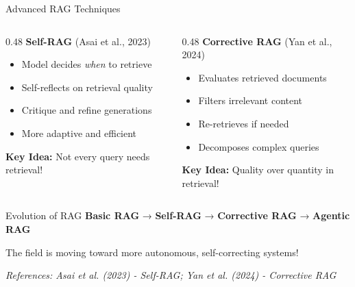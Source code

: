 \documentclass[aspectratio=169]{beamer}
\begin{document}
\begin{frame}[shrink=10]{Advanced RAG Techniques 🚀}
\begin{columns}[T]
\begin{column}{0.48\textwidth}
\textbf{Self-RAG} (Asai et al., 2023)
\begin{itemize}\setlength{\itemsep}{0pt}
    \item Model decides \textit{when} to retrieve
    \item Self-reflects on retrieval quality
    \item Critique and refine generations
    \item More adaptive and efficient
\end{itemize}

\vspace{1em}

\textbf{Key Idea:}
Not every query needs retrieval!
\end{column}

\begin{column}{0.48\textwidth}
\textbf{Corrective RAG} (Yan et al., 2024)
\begin{itemize}\setlength{\itemsep}{0pt}
    \item Evaluates retrieved documents
    \item Filters irrelevant content
    \item Re-retrieves if needed
    \item Decomposes complex queries
\end{itemize}

\vspace{1em}

\textbf{Key Idea:}
Quality over quantity in retrieval!
\end{column}
\end{columns}

\vspace{1em}

\begin{alertblock}{Evolution of RAG}
\textbf{Basic RAG} → \textbf{Self-RAG} → \textbf{Corrective RAG} → \textbf{Agentic RAG}

The field is moving toward more autonomous, self-correcting systems!
\end{alertblock}

\small
\textit{References: Asai et al. (2023) - Self-RAG; Yan et al. (2024) - Corrective RAG}
\end{frame}
\end{document}
